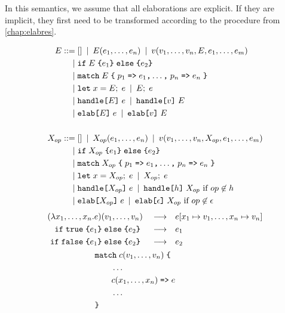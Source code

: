 In this semantics, we assume that all elaborations are explicit. If they are implicit, they first need to be transformed according to the procedure from \cref{chap:elabres}.

\begin{figure}[p]
\begin{align*}
    E
        \IS & [] \OR E(e_1,\dots, e_n) \OR v(v_1,\dots,v_n,E,e_1,\dots,e_m) \\
        \OR & \cond{E}{e_1}{e_2} \\
        \OR & \kw{match}\;E\;\tok{\{}\;p_1\;\tok{=>}\;e_1\tok{,}\dots\tok{,}\;p_n\;\tok{=>}\;e_n\;\tok{\}} \\
        \OR & \kw{let}\;x = E;\;e \OR E;\;e\\
        \OR & \kw{handle}\tok{[}E\tok{]}\;e \OR \kw{handle}\tok{[}v\tok{]}\;E \\
        \OR & \kw{elab}\tok{[}E\tok{]}\;e \OR \kw{elab}\tok{[}v\tok{]}\;E\\
    \\
    X_{op}
        \IS & [] \OR X_{op}(e_1, \dots, e_n) \OR v(v_1, \dots, v_n, X_{op}, e_1, \dots, e_m) \\
        \OR & \cond{X_{op}}{e_1}{e_2} \\
        \OR & \kw{match}\;X_{op}\;\tok{\{}\;p_1\;\tok{=>}\;e_1\tok{,}\dots\tok{,}\;p_n\;\tok{=>}\;e_n\;\tok{\}} \\
        \OR & \kw{let}\;x = X_{op};\;e \OR X_{op};\;e \\
        \OR & \kw{handle}\tok{[}X_{op}\tok{]}\;e \OR \kw{handle}\tok{[}h\tok{]}\;{X_{op}} \text{ if } op\not\in h \\
        \OR & \elab\tok{[}X_{op}\tok{]}\;e \OR \kw{elab}\tok{[}\epsilon\tok{]}\;X_{op} \text{ if } op \not\in \epsilon
\end{align*}
\begin{align*}
    (\lambda x_1, \dots, x_n . e) (v_1, \dots, v_n) \reduce& e[x_1 \mapsto v_1, \dots, x_n \mapsto v_n] \\
    \cond{\true}{e_1}{e_2} \reduce& e_1 \\
    \cond{\false}{e_1}{e_2} \reduce& e_2 \\
    \begin{aligned}
    &\kw{match}\;c(v_1,\dots, v_n)\;\tok{\{}\\
    &\qquad\dots\\
    &\qquad c(x_1, \dots, x_n)\;\tok{=>}\;e\\
    &\qquad\dots\\
    &\tok{\}}
    \end{aligned}

\end{align*}
\end{figure}
